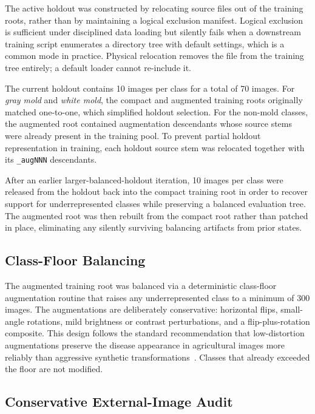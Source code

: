 The active holdout was constructed by relocating source files out of the
training roots, rather than by maintaining a logical exclusion manifest.
Logical exclusion is sufficient under disciplined data loading but
silently fails when a downstream training script enumerates a directory
tree with default settings, which is a common mode in practice. Physical
relocation removes the file from the training tree entirely; a default
loader cannot re-include it.

The current holdout contains 10 images per class for a total of 70
images. For \emph{gray mold} and \emph{white mold}, the compact and
augmented training roots originally matched one-to-one, which simplified
holdout selection. For the non-mold classes, the augmented root
contained augmentation descendants whose source stems were already
present in the training pool. To prevent partial holdout representation
in training, each holdout source stem was relocated together with its
\texttt{\_augNNN} descendants.

After an earlier larger-balanced-holdout iteration, 10 images per class
were released from the holdout back into the compact training root in
order to recover support for underrepresented classes while preserving a
balanced evaluation tree. The augmented root was then rebuilt from the
compact root rather than patched in place, eliminating any silently
surviving balancing artifacts from prior states.

\subsection{Class-Floor Balancing}

The augmented training root was balanced via a deterministic class-floor
augmentation routine that raises any underrepresented class to a minimum
of 300 images. The augmentations are deliberately conservative: horizontal
flips, small-angle rotations, mild brightness or contrast perturbations,
and a flip-plus-rotation composite. This design follows the standard
recommendation that low-distortion augmentations preserve the disease
appearance in agricultural images more reliably than aggressive synthetic
transformations~\citep{shorten2019augmentation}. Classes that already
exceeded the floor are not modified.

\subsection{Conservative External-Image Audit}

